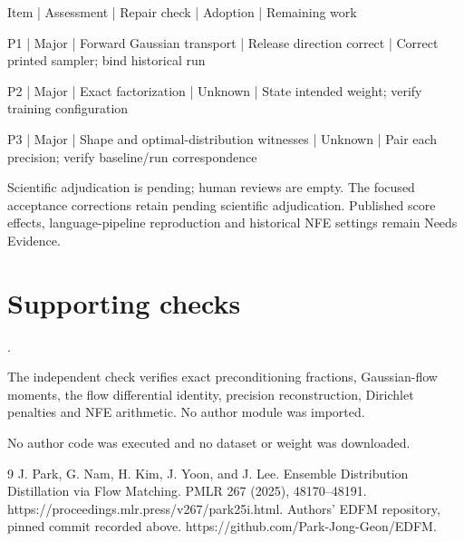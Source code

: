 \documentclass[10pt]{article}
\begin{document}
Item | Assessment | Repair check | Adoption | Remaining work\par
P1 | Major | Forward Gaussian transport | Release direction correct | Correct printed sampler; bind historical run\par
P2 | Major | Exact factorization | Unknown | State intended weight; verify training configuration\par
P3 | Major | Shape and optimal-distribution witnesses | Unknown | Pair each precision; verify baseline/run correspondence\par
Scientific adjudication is pending; human reviews are empty. The focused acceptance corrections retain pending scientific adjudication. Published score effects, language-pipeline reproduction and historical NFE settings remain Needs Evidence.\par
\section*{Supporting checks}
.\par
The independent check verifies exact preconditioning fractions, Gaussian-flow moments, the flow differential identity, precision reconstruction, Dirichlet penalties and NFE arithmetic. No author module was imported.\par
No author code was executed and no dataset or weight was downloaded.\par
9 J. Park, G. Nam, H. Kim, J. Yoon, and J. Lee. Ensemble Distribution Distillation via Flow Matching. PMLR 267 (2025), 48170–48191. https://proceedings.mlr.press/v267/park25i.html. Authors’ EDFM repository, pinned commit recorded above. https://github.com/Park-Jong-Geon/EDFM.\par
\end{document}
